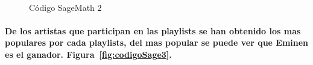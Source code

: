 \documentclass[11pt,spanish]{article}
\begin{document}
\begin{figure}[H]
	\begin{center}
%
	   
	   \\ %
	  
%
	\end{center}
	\caption{%
	Código SageMath 2
 	}%
	\label{fig:codigoSage2}
\end{figure}


\paragraph*{De los artistas que participan en las playlists se han obtenido 
los mas populares por cada playlists, del mas popular se puede ver que Eminen es el ganador. Figura~\ref{fig:codigoSage3}.}
\end{document}
